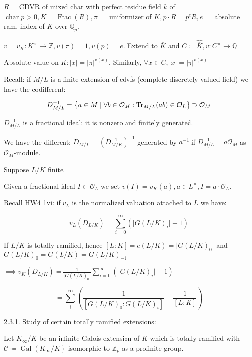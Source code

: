 \documentclass{article}
\theoremstyle{definition}
\numberwithin{theorem}{subsection}
\begin{document}
    \(R\) = CDVR of mixed char with perfect residue field \(k\) of \(\operatorname{char} p > 0, K = \operatorname{Frac}(R), \pi =\) uniformizer of \(K, p\cdot R = p^e R, e =\) absolute ram. index of \(K\) over \(\mathbb{Q}_p\).


    \(v = v_K: K^\times \to \mathbb{Z} , v(\pi) = 1, v(p) = e\). Extend to \(\overline{K}\) and \(C \coloneqq \widehat{\overline{K}}, v: C^\times \to \mathbb{Q}\)
    
    Absolute value on \(K: \vert x \vert = \vert \pi \vert^{v(x)}\). Similarly, \(\forall x\in C, \vert x \vert = \vert \pi \vert^{v(x)}\)

    Recall: if \(M / L\) is a finite extension of cdvfs (complete discretely valued field) we have the codifferent:

    \[
        D_{M / L}^{-1} = \left\{ a\in M \mid \forall b\in \mathcal{O}_M: \Tr_{M / L} (ab) \in \mathcal{O}_L \right\} \supset \mathcal{O}_M
    \]


    \(D_{M / L} ^{-1}\) is a fractional ideal: it is nonzero and finitely generated.

    We have the different: \(D_{M / L} = (D ^{-1} _{M / K}) ^{-1}\) generated by \(a ^{-1}\) if \(D_{M / L} ^{-1} = a \mathcal{O}_M\) as \(\mathcal{O}_M\)-module.

    Suppose \(L / K\) finite.

    Given a fractional ideal \(I \subset \mathcal{O}_L\) we set \(v(I) = v_K(a), a\in L^\times, I = a \cdot \mathcal{O}_L\).

    Recall HW4 1vi: if \(v_L\) is the normalized valuation attached to \(L\) we have:

    \[
        v_L(D_{L / K}) = \sum_{i=0}^{\infty} (\vert G(L / K)_i \vert - 1)
    \]

    If \(L / K\) is totally ramified, hence \([L:K] = e(L / K) = \vert G(L / K)_0 \vert\) and \(G(L / K)_0 = G(L / K) = G(L / K)_{-1}\)

    \(\implies v_K(D_{L / K}) = \frac{1}{\vert G(L / K)_0 \vert} \sum_{i=0}^{\infty} (\vert G(L / K)_i \vert - 1)\) 

    \[
        = \sum_{i}^{\infty} \left( \frac{1}{[G(L / K)_0 : G(L / K)_i]} - \frac{1}{[L:K]} \right)
    \]

    \underline{2.3.1. Study of certain totally ramified extensions:}

    Let \(K_{\infty} / K\) be an infinite Galois extension of \(K\) which is totally ramified with \(\mathscr{C} \coloneqq \operatorname{Gal}(K_\infty / K)\) isomorphic to \(\mathbb{Z}_p\) as a profinite group.
\end{document}
